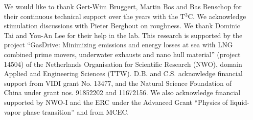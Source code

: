 \documentclass[aps,twocolumn,10pt,floatfix, superscriptaddress,longbibliography,pra]{revtex4-1}
\begin{document}
\begin{acknowledgments}
We would like to thank Gert-Wim Bruggert, Martin Bos and Bas Benschop for their continuous technical support over the years with the T$^3$C. We acknowledge stimulation discussions with Pieter Berghout on roughness. We thank Dominic Tai and You-An Lee for their help in the lab. This research is supported by the project “GasDrive: Minimizing emissions and energy losses at sea with LNG combined prime movers, underwater exhausts and nano hull material” (project 14504) of the Netherlands Organisation for Scientific Research (NWO), domain Applied and Engineering Sciences (TTW). D.B. and C.S. acknowledge financial support from VIDI grant No. 13477, and the Natural Science Foundation of China under grant nos. 91852202 and 11672156. We also acknowledge financial supported by NWO-I and the ERC under the Advanced Grant ``Physics of liquid-vapor phase transition'' and from MCEC.
\end{acknowledgments}


\end{document}
